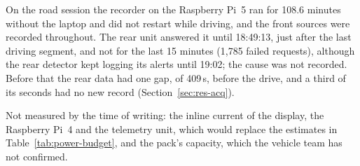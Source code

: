 On the road session the recorder on the Raspberry Pi~5 ran for 108.6 minutes without the laptop and did not restart while driving, and the front sources were recorded throughout. The rear unit answered it until 18:49:13, just after the last driving segment, and not for the last 15 minutes (1,785 failed requests), although the rear detector kept logging its alerts until 19:02; the cause was not recorded. Before that the rear data had one gap, of 409\,s, before the drive, and a third of its seconds had no new record (Section~\ref{sec:res-acq}).

Not measured by the time of writing: the inline current of the display, the Raspberry Pi~4 and the telemetry unit, which would replace the estimates in Table~\ref{tab:power-budget}, and the pack's capacity, which the vehicle team has not confirmed.
